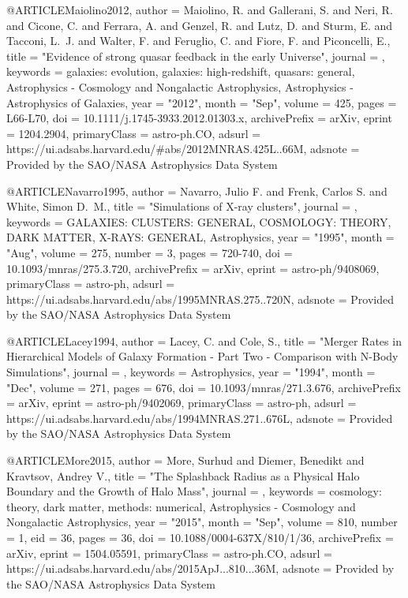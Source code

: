 {@ARTICLE{Maiolino2012,
       author = {{Maiolino}, R. and {Gallerani}, S. and {Neri}, R. and {Cicone}, C. and
         {Ferrara}, A. and {Genzel}, R. and {Lutz}, D. and {Sturm}, E. and
         {Tacconi}, L.~J. and {Walter}, F. and {Feruglio}, C. and {Fiore}, F. and
         {Piconcelli}, E.},
        title = "{Evidence of strong quasar feedback in the early Universe}",
      journal = {\mnras},
     keywords = {galaxies: evolution, galaxies: high-redshift, quasars: general, Astrophysics - Cosmology and Nongalactic Astrophysics, Astrophysics - Astrophysics of Galaxies},
         year = "2012",
        month = "Sep",
       volume = {425},
        pages = {L66-L70},
          doi = {10.1111/j.1745-3933.2012.01303.x},
archivePrefix = {arXiv},
       eprint = {1204.2904},
 primaryClass = {astro-ph.CO},
       adsurl = {https://ui.adsabs.harvard.edu/\#abs/2012MNRAS.425L..66M},
      adsnote = {Provided by the SAO/NASA Astrophysics Data System}
}

@ARTICLE{Navarro1995,
       author = {{Navarro}, Julio F. and {Frenk}, Carlos S. and {White}, Simon D.~M.},
        title = "{Simulations of X-ray clusters}",
      journal = {\mnras},
     keywords = {GALAXIES: CLUSTERS: GENERAL, COSMOLOGY: THEORY, DARK MATTER, X-RAYS: GENERAL, Astrophysics},
         year = "1995",
        month = "Aug",
       volume = {275},
       number = {3},
        pages = {720-740},
          doi = {10.1093/mnras/275.3.720},
archivePrefix = {arXiv},
       eprint = {astro-ph/9408069},
 primaryClass = {astro-ph},
       adsurl = {https://ui.adsabs.harvard.edu/abs/1995MNRAS.275..720N},
      adsnote = {Provided by the SAO/NASA Astrophysics Data System}
}

@ARTICLE{Lacey1994,
       author = {{Lacey}, C. and {Cole}, S.},
        title = "{Merger Rates in Hierarchical Models of Galaxy Formation - Part Two - Comparison with N-Body Simulations}",
      journal = {\mnras},
     keywords = {Astrophysics},
         year = "1994",
        month = "Dec",
       volume = {271},
        pages = {676},
          doi = {10.1093/mnras/271.3.676},
archivePrefix = {arXiv},
       eprint = {astro-ph/9402069},
 primaryClass = {astro-ph},
       adsurl = {https://ui.adsabs.harvard.edu/abs/1994MNRAS.271..676L},
      adsnote = {Provided by the SAO/NASA Astrophysics Data System}
}

@ARTICLE{More2015,
       author = {{More}, Surhud and {Diemer}, Benedikt and {Kravtsov}, Andrey V.},
        title = "{The Splashback Radius as a Physical Halo Boundary and the Growth of Halo Mass}",
      journal = {\apj},
     keywords = {cosmology: theory, dark matter, methods: numerical, Astrophysics - Cosmology and Nongalactic Astrophysics},
         year = "2015",
        month = "Sep",
       volume = {810},
       number = {1},
          eid = {36},
        pages = {36},
          doi = {10.1088/0004-637X/810/1/36},
archivePrefix = {arXiv},
       eprint = {1504.05591},
 primaryClass = {astro-ph.CO},
       adsurl = {https://ui.adsabs.harvard.edu/abs/2015ApJ...810...36M},
      adsnote = {Provided by the SAO/NASA Astrophysics Data System}
}

}
